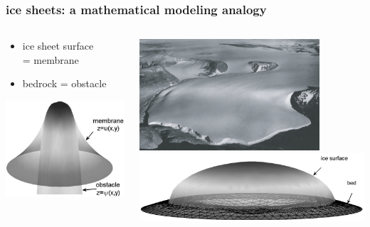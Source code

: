 \documentclass{beamer}
\begin{document}
\begin{frame}
  \frametitle{ice sheets: a mathematical modeling analogy}

\begin{columns}
\begin{column}{0.35\textwidth}
\begin{itemize}
\item ice sheet surface \\ = \alert{membrane}
\item bedrock = \alert{obstacle}
\end{itemize}
\vfill
\begin{center}
\includegraphics[width=1.1\textwidth]{classicalobs}
\end{center}
\end{column}
\begin{column}{0.65\textwidth}
\begin{center}
\includegraphics[width=0.8\textwidth]{polaris} \\
\includegraphics[width=\textwidth]{capnonflatobs}
\end{center}
\end{column}
\end{columns}
\end{frame}
\end{document}
